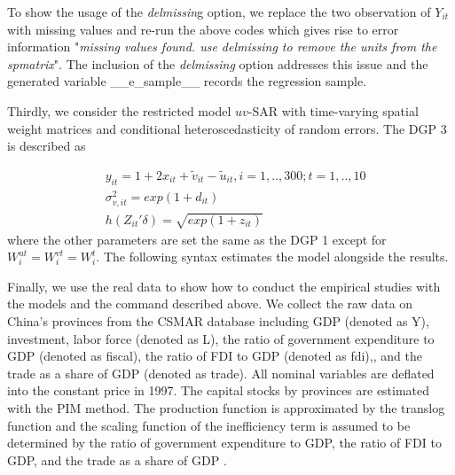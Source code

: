  To show the usage of the \textit{delmissin}g option, we replace the two observation of $Y_{it}$ with missing values and re-run the above codes which gives rise to error information "\textit{missing values found. use delmissing to remove the units from the spmatrix}".  The inclusion of the \textit{delmissing} option addresses this issue and the generated variable \_\_e\_sample\_\_ records the regression sample. 
 
 \begin{stlog}
 	
 \end{stlog}
  \begin{stlog}
 	
 \end{stlog}
 
 
 Thirdly, we consider the restricted model $uv$-SAR with time-varying spatial weight matrices and conditional heteroscedasticity of random errors. The DGP 3 is described as
 
 
 
 \begin{equation}\label{dgp3}
 	 \begin{aligned}
 		& y_{it} = 1+2x_{it} + \tilde{v}_{it}-\tilde{u}_{it}, i=1,..,300; t=1,..,10  \\
 		& \sigma_{v,it}^2 = exp(1+d_{it})  \\
 		&  h(Z_{it}'\delta) = \sqrt{exp(1+z_{it})}
 	\end{aligned}
 \end{equation}
 where the other parameters are set the same as the DGP 1 except for $W_{i}^{ut}=W_{i}^{vt}=W_{i}^t$. The following syntax estimates the model alongside the results.
 
 \begin{stlog}
 	
 \end{stlog}
 
 
Finally, we use the real data to show how to conduct the empirical studies with the models and the command  described above. We collect the raw data on China's provinces from the CSMAR database including  GDP (denoted as Y), investment, labor force (denoted as L), the ratio of government expenditure to GDP (denoted as fiscal), the ratio of FDI to GDP (denoted as fdi),, and the trade as a share of GDP (denoted as trade).  All nominal variables are deflated into the constant price in 1997.  The capital stocks by provinces are estimated  with the PIM method.  The production function is approximated by the translog function and the scaling function of the inefficiency term is assumed to be determined by the ratio of government expenditure to GDP, the ratio of FDI to GDP, and the trade as a share of GDP . 

